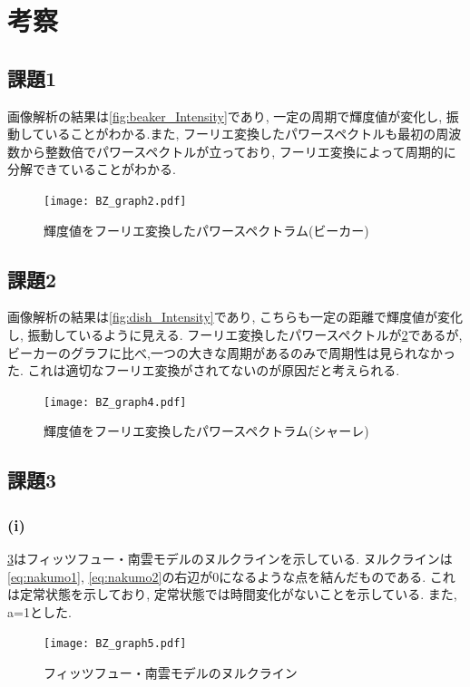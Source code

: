 \documentclass[11pt]{ltjsarticle}
\begin{document}
  \section*{考察}
    \subsection*{課題1}
      画像解析の結果は\cref{fig:beaker_Intensity}であり, 一定の周期で輝度値が変化し, 振動していることがわかる.また, フーリエ変換したパワースペクトルも最初の周波数から整数倍でパワースペクトルが立っており, フーリエ変換によって周期的に分解できていることがわかる.
      \begin{figure}[H]
        \centering
        \texttt{[image: BZ\_graph2.pdf]}
        \caption{輝度値をフーリエ変換したパワースペクトラム(ビーカー)}
        \label{fig:beaker_power}
      \end{figure}
    \subsection*{課題2}
      画像解析の結果は\cref{fig:dish_Intensity}であり, こちらも一定の距離で輝度値が変化し, 振動しているように見える. フーリエ変換したパワースペクトルが\cref{fig:dish_power}であるが, ビーカーのグラフに比べ,一つの大きな周期があるのみで周期性は見られなかった. これは適切なフーリエ変換がされてないのが原因だと考えられる.
      \begin{figure}[H]
        \centering
        \texttt{[image: BZ\_graph4.pdf]}
        \caption{輝度値をフーリエ変換したパワースペクトラム(シャーレ)}
        \label{fig:dish_power}
      \end{figure}
    \subsection*{課題3}
      \subsubsection*{(i)}
        \cref{fig:nullcline}はフィッツフュー・南雲モデルのヌルクラインを示している. ヌルクラインは\cref{eq:nakumo1}, \cref{eq:nakumo2}の右辺が0になるような点を結んだものである. これは定常状態を示しており, 定常状態では時間変化がないことを示している. また, a=1とした.
        \begin{figure}[H]
          \centering
          \texttt{[image: BZ\_graph5.pdf]}
          \caption{フィッツフュー・南雲モデルのヌルクライン}
          \label{fig:nullcline}
        \end{figure}
\end{document}
